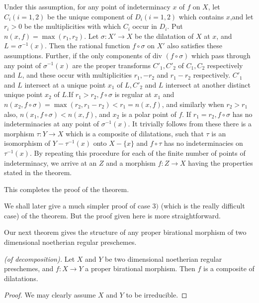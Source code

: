 Under this assumption, for any point of indeterminacy $x$ of $f$ on
$X$, let $C_{i} (i = 1, 2)$ be the unique component of $D_{i}(i =
1,2)$ which contains $x$,and let $r_{i} > 0$ be the multiplicities
with which $C_{i}$ occur in $D_{i}$. Put $n(x, f) = \max (r_{1},
r_{2})$. Let $\sigma : X' \to X$ be the dilatation of $X$ at $x$, and
$L = \sigma^{-1}(x)$. Then the rational function $f \circ \sigma$ on
$X'$ also satisfies these assumptions. Further, if the only components
of div $(f \circ \sigma)$ which pass through any point of
$\sigma^{-1}(x)$ are the proper transforms $C'_{1}, C'_{2}$ of $C_{1},
C_{2}$ respectively and $L$, and these occur with multiplicities
$r_{1}, -r_{2}$ and $r_{1} - r_{2}$ respectively. $C'_{1}$ and $L$
intersect at a unique point $x_{1}$ of $L, C'_{2}$ and $L$ intersect
at another distinct unique point $x_{2}$ of $L$.\pageoriginale If
$r_{1} > r_{2}, f \circ \sigma$ is regular at $x_{1}$ and
 $n(x_{2}, f \circ \sigma) =
  \max (r_{2}, r_{1}- r_{2}) < r_{1} = n(x,f)$, and similarly when
$r_{2} > r_{1}$ also, $n(x_{1}, f \circ \sigma) < n(x, f)$, and
$x_{2}$ is a polar point of $f$. If $r_{1} = r_{2}, f \circ \sigma$
has no indeterminacies at any point of $\sigma^{-1}(x)$. It trivially
follows from these there is a morphism $\tau : Y \to X$ which is a
composite of dilatations, such that $\tau$ is an isomorphism of $Y -
\tau^{-1}(x)$ onto $X-\{x\}$ and $f \circ \tau$ has no indeterminacies
on $\tau^{-1}(x)$. By repeating this procedure for each of the finite
number of points of indeterminacy, we arrive at an $Z$ and a morphism
$f : Z \to X$ having the properties stated in the theorem. 

This completes the proof of the theorem.

\begin{remark*}%
  We shall later give a much simpler proof of case $3)$ (which is the
  really difficult case) of the theorem. But the proof given here is
  more straightforward. 
\end{remark*}        

Our next theorem gives the structure of any proper birational morphism
of two dimensional noetherian regular preschemes. 

\begin{theorem*}{\em (of decomposition).} 
  Let $X$ and $Y$ be two dimensional noetherian regular preschemes,
  and $f:X \to Y$ a proper birational morphism. Then $f$ is a
  composite of dilatations.  
\end{theorem*}
 
\begin{proof}
  We may clearly assume $X$ and $Y$ to be irreducible.  
\end{proof} 
 
